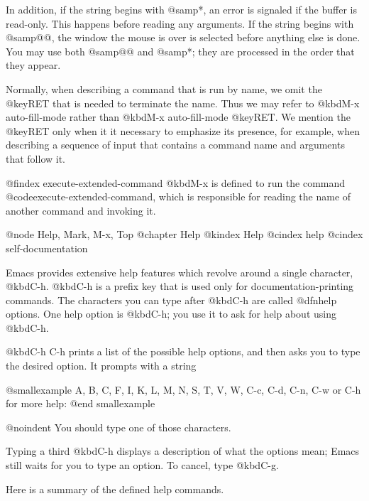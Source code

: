 {{In addition, if the string begins with @samp{*}, an error is
signaled if the buffer is read-only.  This happens before reading any
arguments.  If the string begins with @samp{@@}, the window the mouse is
over is selected before anything else is done.  You may use both
@samp{@@} and @samp{*}; they are processed in the order that they appear.

Normally, when describing a command that is run by name, we omit the
@key{RET} that is needed to terminate the name.  Thus we may refer to
@kbd{M-x auto-fill-mode} rather than @kbd{M-x auto-fill-mode} @key{RET}.
We mention the @key{RET} only when it it necessary to emphasize its
presence, for example, when describing a sequence of input that contains
a command name and arguments that follow it.

@findex execute-extended-command
  @kbd{M-x} is defined to run the command @code{execute-extended-command},
which is responsible for reading the name of another command and invoking
it.

@node Help, Mark, M-x, Top
@chapter Help
@kindex Help
@cindex help
@cindex self-documentation

  Emacs provides extensive help features which revolve around a single
character, @kbd{C-h}.  @kbd{C-h} is a prefix key that is used only for
documentation-printing commands.  The characters you can type after
@kbd{C-h} are called @dfn{help options}.  One help option is @kbd{C-h};
you use it to ask for help about using @kbd{C-h}.

  @kbd{C-h C-h} prints a list of the possible help options, and then asks
you to type the desired option.  It prompts with a string

@smallexample
A, B, C, F, I, K, L, M, N, S, T, V, W, C-c, C-d, C-n, C-w or C-h for more help:
@end smallexample

@noindent
You should type one of those characters.

  Typing a third @kbd{C-h} displays a description of what the options mean;
Emacs still waits for you to type an option.  To cancel, type @kbd{C-g}.

  Here is a summary of the defined help commands.

}}
